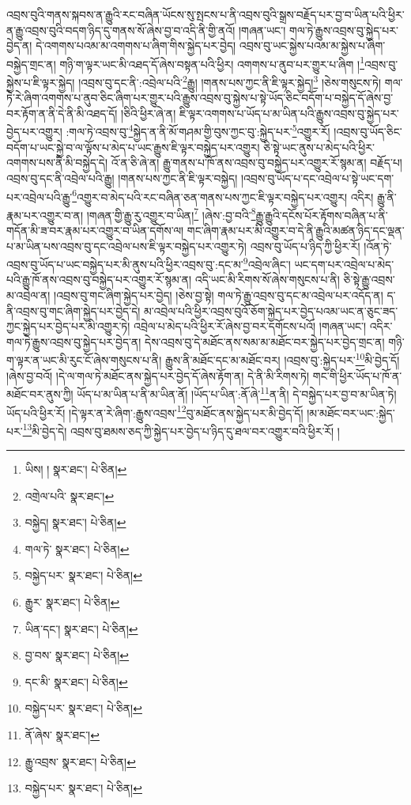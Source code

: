 འབྲས་བུའི་གནས་སྐབས་ན་རྒྱུའི་རང་བཞིན་ཡོངས་སུ་སྤངས་པ་ནི་འབྲས་བུའི་སྒྲས་བརྗོད་པར་བྱ་བ་ཡིན་པའི་ཕྱིར་ན་རྒྱུ་འབྲས་བུའི་བདག་ཉིད་དུ་གནས་སོ་ཞེས་བྱ་བ་འདི་ནི་གྱི་ནའོ། །གཞན་ཡང་། གལ་ཏེ་རྒྱུས་འབྲས་བུ་སྐྱེད་པར་བྱེད་ན། དེ་འགགས་པའམ་མ་འགགས་པ་ཞིག་གིས་སྐྱེད་པར་བྱེད། འབྲས་བུ་ཡང་སྐྱེས་པའམ་མ་སྐྱེས་པ་ཞིག་བསྐྱེད་གྲང་ན། གཉི་ག་ལྟར་ཡང་མི་འཐད་དོ་ཞེས་བསྟན་པའི་ཕྱིར། འགགས་པ་ནུབ་པར་གྱུར་པ་ཞིག །\footnote{ཡིས། །  སྣར་ཐང་།  པེ་ཅིན། }འབྲས་བུ་སྐྱེས་པ་ཇི་ལྟར་སྐྱེད། །འབྲས་བུ་དང་ནི་:འབྲེལ་པའི་\footnote{འགྲེལ་པའི་  སྣར་ཐང་། }རྒྱུ། །གནས་པས་ཀྱང་ནི་ཇི་ལྟར་སྐྱེད།\footnote{བསྐྱེད།  སྣར་ཐང་།  པེ་ཅིན། } །ཅེས་གསུངས་ཏེ། གལ་ཏེ་རེ་ཞིག་འགགས་པ་ནུབ་ཅིང་ཞིག་པར་གྱུར་པའི་རྒྱུས་འབྲས་བུ་སྐྱེས་པ་སྟེ་ཡོད་ཅིང་བདོག་པ་བསྐྱེད་དོ་ཞེས་བྱ་བར་རྟོག་ན་ནི་དེ་ནི་མི་འཐད་དོ། །ཅིའི་ཕྱིར་ཞེ་ན། ཇི་ལྟར་འགགས་པ་ཡོད་པ་མ་ཡིན་པའི་རྒྱུས་འབྲས་བུ་སྐྱེད་པར་བྱེད་པར་འགྱུར། :གལ་ཏེ་འབྲས་བུ་\footnote{གལ་ཏེ་  སྣར་ཐང་།  པེ་ཅིན། }སྐྱེད་ན་ནི་མོ་གཤམ་གྱི་བུས་ཀྱང་བུ་:སྐྱེད་པར་\footnote{བསྐྱེད་པར་  སྣར་ཐང་།  པེ་ཅིན། }འགྱུར་རོ། །འབྲས་བུ་ཡོད་ཅིང་བདོག་པ་ཡང་སྐྱེ་བ་ལ་ལྟོས་པ་མེད་པ་ཡང་རྒྱུས་ཇི་ལྟར་བསྐྱེད་པར་འགྱུར། ཅི་སྟེ་ཡང་ནུས་པ་མེད་པའི་ཕྱིར་འགགས་པས་ནི་མི་བསྐྱེད་དེ། འོ་ན་ཅི་ཞེ་ན། རྒྱུ་གནས་པ་ཁོ་ནས་འབྲས་བུ་བསྐྱེད་པར་འགྱུར་རོ་སྙམ་ན། བརྗོད་པ། འབྲས་བུ་དང་ནི་འབྲེལ་པའི་རྒྱུ། །གནས་པས་ཀྱང་ནི་ཇི་ལྟར་བསྐྱེད། །འབྲས་བུ་ཡོད་པ་དང་འབྲེལ་པ་སྟེ་ཡང་དག་པར་འབྲེལ་པའི་རྒྱུ་\footnote{རྒྱུར་  སྣར་ཐང་།  པེ་ཅིན། }འགྱུར་བ་མེད་པའི་རང་བཞིན་ཅན་གནས་པས་ཀྱང་ཇི་ལྟར་བསྐྱེད་པར་འགྱུར། འདིར། རྒྱུ་ནི་རྣམ་པར་འགྱུར་བ་ན། །གཞན་གྱི་རྒྱུ་རུ་འགྱུར་བ་ཡིན།\footnote{ཡིན་དང་།  སྣར་ཐང་།  པེ་ཅིན། } །ཞེས་:བྱ་བའི་\footnote{བྱ་བས་  སྣར་ཐང་།  པེ་ཅིན། }རྒྱུ་རྒྱུའི་དངོས་པོར་རྟོགས་བཞིན་པ་ནི་གདོན་མི་ཟ་བར་རྣམ་པར་འགྱུར་བ་ཡིན་དགོས་ལ། གང་ཞིག་རྣམ་པར་མི་འགྱུར་བ་དེ་ནི་རྒྱུའི་མཚན་ཉིད་དང་ལྡན་པ་མ་ཡིན་པས་འབྲས་བུ་དང་འབྲེལ་པས་ཇི་ལྟར་བསྐྱེད་པར་འགྱུར་ཏེ། འབྲས་བུ་ཡོད་པ་ཉིད་ཀྱི་ཕྱིར་རོ། །འོན་ཏེ་འབྲས་བུ་ཡོད་པ་ཡང་བསྐྱེད་པར་མི་ནུས་པའི་ཕྱིར་འབྲས་བུ་:དང་མ་\footnote{དང་མི་  སྣར་ཐང་།  པེ་ཅིན། }འབྲེལ་ཞིང་། ཡང་དག་པར་འབྲེལ་པ་མེད་པའི་རྒྱུ་ཁོ་ནས་འབྲས་བུ་བསྐྱེད་པར་འགྱུར་རོ་སྙམ་ན། འདི་ཡང་མི་རིགས་སོ་ཞེས་གསུངས་པ་ནི། ཅི་སྟེ་རྒྱུ་འབྲས་མ་འབྲེལ་ན། །འབྲས་བུ་གང་ཞིག་སྐྱེད་པར་བྱེད། །ཅེས་བྱ་སྟེ། གལ་ཏེ་རྒྱུ་འབྲས་བུ་དང་མ་འབྲེལ་པར་འདོད་ན། ད་ནི་འབྲས་བུ་གང་ཞིག་སྐྱེད་པར་བྱེད་དེ། མ་འབྲེལ་པའི་ཕྱིར་འབྲས་བུའོ་ཅོག་སྐྱེད་པར་བྱེད་པའམ་ཡང་ན་ཅུང་ཟད་ཀྱང་སྐྱེད་པར་བྱེད་པར་མི་འགྱུར་ཏེ། འབྲེལ་པ་མེད་པའི་ཕྱིར་རོ་ཞེས་བྱ་བར་དགོངས་པའོ། །གཞན་ཡང་། འདིར་གལ་ཏེ་རྒྱུས་འབྲས་བུ་སྐྱེད་པར་བྱེད་ན། དེས་འབྲས་བུ་དེ་མཐོང་ནས་སམ་མ་མཐོང་བར་སྐྱེད་པར་བྱེད་གྲང་ན། གཉི་ག་ལྟར་ན་ཡང་མི་རུང་ངོ་ཞེས་གསུངས་པ་ནི། རྒྱུས་ནི་མཐོང་དང་མ་མཐོང་བར། །འབྲས་བུ་:སྐྱེད་པར་\footnote{བསྐྱེད་པར་  སྣར་ཐང་།  པེ་ཅིན། }མི་བྱེད་དོ། །ཞེས་བྱ་བའོ། །དེ་ལ་གལ་ཏེ་མཐོང་ནས་སྐྱེད་པར་བྱེད་དོ་ཞེས་རྟོག་ན། དེ་ནི་མི་རིགས་ཏེ། གང་གི་ཕྱིར་ཡོད་པ་ཁོ་ན་མཐོང་བར་ནུས་ཀྱི། ཡོད་པ་མ་ཡིན་པ་ནི་མ་ཡིན་ནོ། །ཡོད་པ་ཡིན་:ནོ་ཞེ་\footnote{ནོ་ཞེས་  སྣར་ཐང་། }ན་ནི། དེ་བསྐྱེད་པར་བྱ་བ་མ་ཡིན་ཏེ། ཡོད་པའི་ཕྱིར་རོ། །དེ་ལྟར་ན་རེ་ཞིག་:རྒྱུས་འབྲས་\footnote{རྒྱུ་འབྲས་  སྣར་ཐང་།  པེ་ཅིན། }བུ་མཐོང་ནས་སྐྱེད་པར་མི་བྱེད་དོ། །མ་མཐོང་བར་ཡང་:སྐྱེད་པར་\footnote{བསྐྱེད་པར་  སྣར་ཐང་།  པེ་ཅིན། }མི་བྱེད་དེ། འབྲས་བུ་ཐམས་ཅད་ཀྱི་སྐྱེད་པར་བྱེད་པ་ཉིད་དུ་ཐལ་བར་འགྱུར་བའི་ཕྱིར་རོ། །
